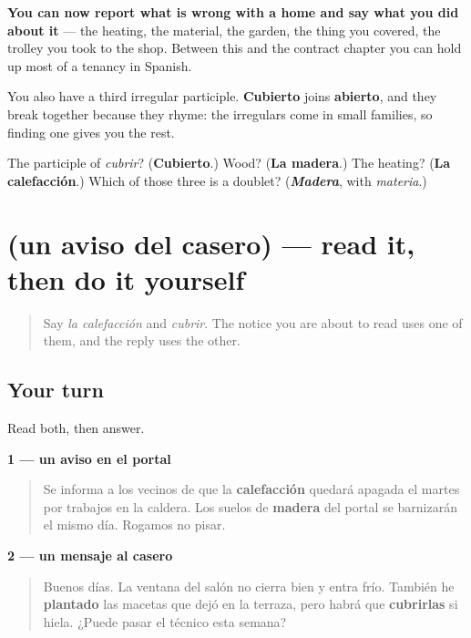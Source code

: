 \begin{grammarlens}[title={What you've built}]
\textbf{You can now report what is wrong with a home and say what you did about it} — the heating, the material, the garden, the thing you covered, the trolley you took to the shop. Between this and the contract chapter you can hold up most of a tenancy in Spanish.

You also have a third irregular participle. \textbf{Cubierto} joins \textbf{abierto}, and they break together because they rhyme: the irregulars come in small families, so finding one gives you the rest.
\end{grammarlens}

\begin{tcolorbox}[breakable,colback=teal!4,colframe=teal!35!black,title={Before you move on}]
The participle of \emph{cubrir}? (\textbf{Cubierto}.) Wood? (\textbf{La madera}.) The heating? (\textbf{La calefacción}.) Which of those three is a doublet? (\emph{\textbf{Madera}}, with \emph{materia}.)
\end{tcolorbox}
\section[Practice]{(un aviso del casero) — read it, then do it yourself}

\label{lesson:ES-C444-sintesis-casa}



\begin{quote}
Say \emph{la calefacción} and \emph{cubrir}. The notice you are about to read uses one of them, and the reply uses the other.
\end{quote}

\subsection*{Your turn}
Read both, then answer.

\textbf{1 — un aviso en el portal}

\begin{quote}
Se informa a los vecinos de que la \textbf{calefacción} quedará apagada el martes por trabajos en la caldera. Los suelos de \textbf{madera} del portal se barnizarán el mismo día. Rogamos no pisar.
\end{quote}

\textbf{2 — un mensaje al casero}

\begin{quote}
Buenos días. La ventana del salón no cierra bien y entra frío. También he \textbf{plantado} las macetas que dejó en la terraza, pero habrá que \textbf{cubrirlas} si hiela. ¿Puede pasar el técnico esta semana?
\end{quote}

